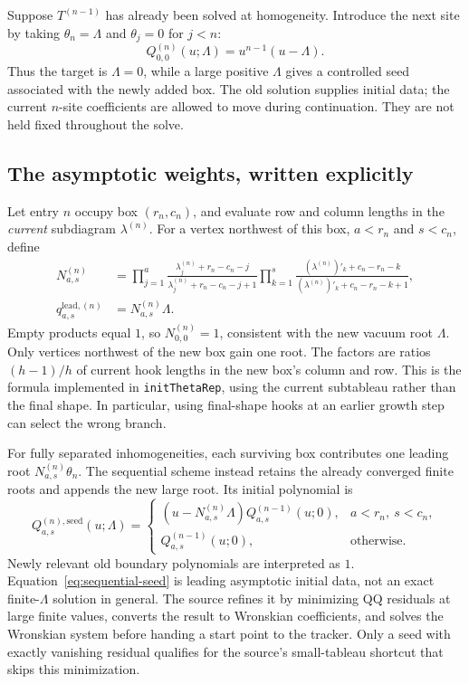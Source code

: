 \documentclass[11pt]{article}
\newcommand{\file}[1]{\texttt{#1}}
\begin{document}
Suppose $T^{(n-1)}$ has already been solved at homogeneity. Introduce the
next site by taking $\theta_n=\Lambda$ and $\theta_j=0$ for $j<n$:
\begin{equation}
 \label{eq:vacuum-lambda}
 Q_{0,0}^{(n)}(u;\Lambda)=u^{n-1}(u-\Lambda).
\end{equation}
Thus the target is $\Lambda=0$, while a large positive $\Lambda$ gives a
controlled seed associated with the newly added box. The old solution
supplies initial data; the current $n$-site coefficients are allowed to
move during continuation. They are not held fixed throughout the solve.

\subsection{The asymptotic weights, written explicitly}

Let entry $n$ occupy box $(r_n,c_n)$, and evaluate row and column lengths
in the \emph{current} subdiagram $\lambda^{(n)}$. For a vertex northwest
of this box, $a<r_n$ and $s<c_n$, define
\begin{align}
 \label{eq:theta-rep}
 N^{(n)}_{a,s}
 &=\prod_{j=1}^{a}
 \frac{\lambda_j^{(n)}+r_n-c_n-j}
      {\lambda_j^{(n)}+r_n-c_n-j+1}
 \prod_{k=1}^{s}
 \frac{(\lambda^{(n)})'_k+c_n-r_n-k}
      {(\lambda^{(n)})'_k+c_n-r_n-k+1},\\
 q^{\mathrm{lead},(n)}_{a,s}&=N^{(n)}_{a,s}\Lambda.
\end{align}
Empty products equal $1$, so $N^{(n)}_{0,0}=1$, consistent with the new
vacuum root $\Lambda$. Only vertices northwest of the new box gain one
root. The factors are ratios $(h-1)/h$ of current hook lengths in the
new box's column and row. This is the formula implemented in
\file{initThetaRep}, using the current subtableau rather than the final
shape. In particular, using final-shape hooks at an earlier growth step
can select the wrong branch.

For fully separated inhomogeneities, each surviving box contributes
one leading root $N^{(n)}_{a,s}\theta_n$. The sequential scheme instead
retains the already converged finite roots and appends the new large
root. Its initial polynomial is
\begin{equation}
 \label{eq:sequential-seed}
 Q^{(n),\mathrm{seed}}_{a,s}(u;\Lambda)=
 \begin{cases}
  (u-N^{(n)}_{a,s}\Lambda)Q^{(n-1)}_{a,s}(u;0),
       &a<r_n,\ s<c_n,\\
  Q^{(n-1)}_{a,s}(u;0),&\text{otherwise}.
 \end{cases}
\end{equation}
Newly relevant old boundary polynomials are interpreted as $1$.
Equation~\eqref{eq:sequential-seed} is leading asymptotic initial data,
not an exact finite-$\Lambda$ solution in general. The source refines it
by minimizing QQ residuals at large finite values, converts the result
to Wronskian coefficients, and solves the Wronskian system before
handing a start point to the tracker. Only a seed with exactly vanishing
residual qualifies for the source's small-tableau shortcut that skips
this minimization.
\end{document}
